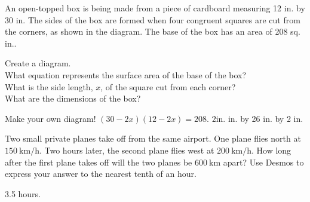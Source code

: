 \documentclass[12pt,fleqn]{book}
\newcommand{\prb}[1]{\begin{Exercise}#1\end{Exercise}}
\newcommand{\sol}[1]{\begin{Answer}#1\end{Answer}}
\begin{document}
\prb{An open-topped box is being made from
	a piece of cardboard measuring 12 in. by
	30 in. The sides of the box are formed
	when four congruent squares are cut from
	the corners, as shown in the diagram. The
	base of the box has an area of 208 sq. in..
	\begin{tasks}
		\task Create a diagram.
		\\[10em]
		\task What equation represents the surface area of the base of the box?
		\\[4em]
		\task What is the side length, $x$, of the square cut from each corner?
		\\[4em]
		\task What are the dimensions of the box?
		\\[4em]
	\end{tasks}
}
\sol{
	\begin{tasks}
		\task Make your own diagram!
		\task $(30-2 x)(12-2 x)=208$.
		\task $2 \mathrm{in}$.
		\task 8 in. by 26 in. by 2 in.
	\end{tasks}
}

\prb{Two small private planes take off from the same airport. One plane flies north at $150 \mathrm{~km} / \mathrm{h}$. Two hours later, the second plane flies west at $200 \mathrm{~km} / \mathrm{h}$. How long after the first plane takes off will the two planes be $600 \mathrm{~km}$ apart? Use Desmos to express your answer to the nearest tenth of an hour.}
\sol{3.5 hours.}
\end{document}
